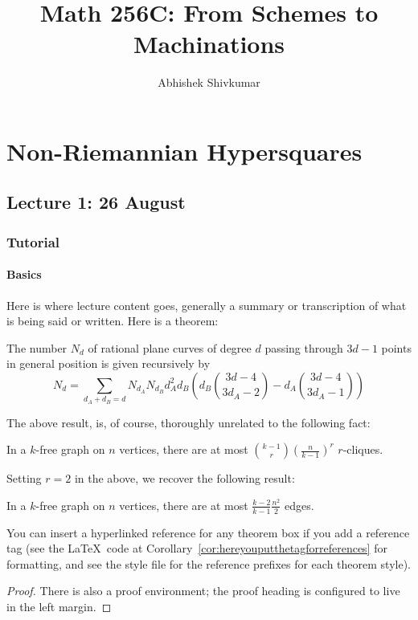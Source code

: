 \documentclass[justified, nofonts, notitlepage, openany, debug]{tufte-book}
\begin{document}
\title{Math 256C: From Schemes to Machinations}
\author{Abhishek Shivkumar}

\part{Non-Riemannian Hypersquares}

\chapter{Lecture 1: 26 August}
\section{Tutorial}
\subsection{Basics}

Here is where lecture content goes, generally a summary or transcription of what is being said or written. Here is a theorem:
\begin{theorem}[Kontsevich]
    The number $N_d$ of rational plane curves of degree $d$ passing through $3d-1$ points in general position is given recursively by $$N_d = \sum_{d_A + d_B = d} N_{d_A} N_{d_B} d_A^2 d_B\left(d_B\binom{3d-4}{3d_A -2} - d_A \binom{3d-4}{3d_A-1}\right)$$
\end{theorem}

The above result, is, of course, thoroughly unrelated to the following fact:
\begin{lemma}
    In a $k$-free graph on $n$ vertices, there are at most $\binom{k-1}{r} (\frac{n}{k-1})^r$ $r$-cliques.
\end{lemma}
Setting $r=2$ in the above, we recover the following result:
\begin{corollary}
    In a $k$-free graph on $n$ vertices, there are at most $\frac{k-2}{k-1} \frac{n^2}{2}$ edges. 
\end{corollary}
You can insert a hyperlinked reference for any theorem box if you add a reference tag (see the \LaTeX\ code at Corollary~\ref{cor:hereyouputthetagforreferences} for formatting, and see the style file for the reference prefixes for each theorem style).
\begin{proof}
    There is also a proof environment; the proof heading is configured to live in the left margin.
\end{proof}
\end{document}
